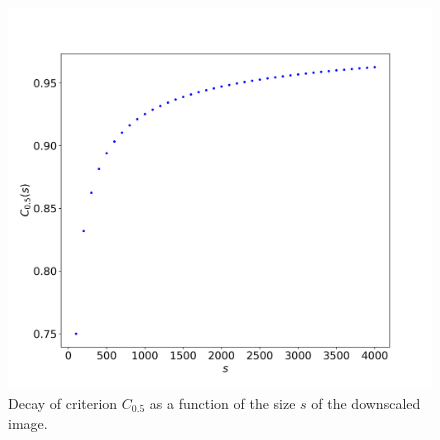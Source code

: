 \documentclass[reprint,amsmath,amssymb,aps,pre]{revtex4-1}
\begin{document}
\begin{figure}[ht]
  \centering
  \includegraphics[width=0.9\linewidth]{images/plot-criterion.png}
  \caption[]{Decay of criterion $C_{0.5}$ as a function of the size $s$ of
    the downscaled image.}
  \label{fig:crit-plot}
\end{figure}
\end{document}
